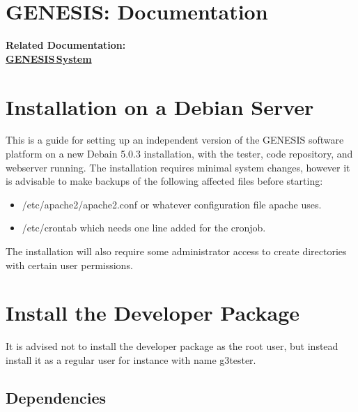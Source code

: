 \documentclass[12pt]{article}
\begin{document}
\section*{GENESIS: Documentation}

{\bf Related Documentation:} \\
\href{../genesis-system/genesis-system.tex}{\bf GENESIS\,System}

\section*{Installation on a Debian Server}

This is a guide for setting up an independent version of the GENESIS software platform on a new Debain 5.0.3 installation, with the tester, code repository, and webserver running. The installation requires minimal system changes, however it is advisable to make backups of the following affected files before starting:

\begin{itemize}
\item[] /etc/apache2/apache2.conf or whatever configuration file apache uses.
\item[] /etc/crontab which needs one line added for the cronjob.
\end{itemize}

The installation will also require some administrator access to create directories with certain user permissions. 

\section*{Install the Developer Package}

It is advised not to install the developer package as the root user, but instead install it as a regular user for instance with name g3tester.

\subsection*{Dependencies}
\end{document}
